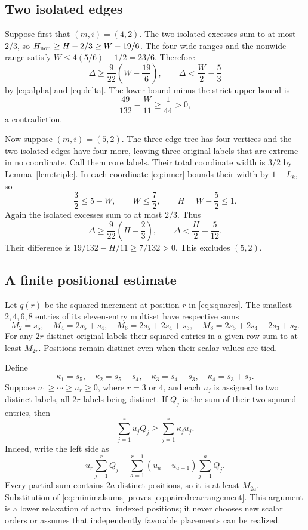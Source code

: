 \documentclass[11pt]{article}
\theoremstyle{definition}
\theoremstyle{remark}
\begin{document}
\subsection{Two isolated edges}

Suppose first that $(m,i)=(4,2)$. The two isolated excesses sum to at most
$2/3$, so $H_{\rm non}\geq H-2/3\geq W-19/6$. The four wide ranges
and the nonwide range satisfy $W\leq4(5/6)+1/2=23/6$. Therefore
\[
 \Delta\geq\frac9{22}\left(W-\frac{19}{6}\right),
 \qquad
 \Delta<\frac W2-\frac53
\]
by \eqref{eq:alpha} and \eqref{eq:delta}. The lower bound minus the
strict upper bound is
\[
 \frac{49}{132}-\frac W{11}\geq\frac1{44}>0,
\]
a contradiction.

Now suppose $(m,i)=(5,2)$. The three-edge tree has four vertices and the
two isolated edges have four more, leaving three original labels that
are extreme in no coordinate. Call them core labels. Their total
coordinate width is $3/2$ by Lemma~\ref{lem:triple}. In each coordinate
\eqref{eq:inner} bounds their width by $1-L_k$, so
\[
 \frac32\leq5-W,\qquad W\leq\frac72,
 \qquad H=W-\frac52\leq1.
\]
Again the isolated excesses sum to at most $2/3$. Thus
\[
 \Delta\geq\frac9{22}\left(H-\frac23\right),
 \qquad
 \Delta<\frac H2-\frac5{12}.
\]
Their difference is $19/132-H/11\geq7/132>0$. This excludes $(5,2)$.

\subsection{A finite positional estimate}\label{subsec:positions}

Let $q(r)$ be the squared increment at position $r$ in
\eqref{eq:squares}. The smallest $2,4,6,8$ entries of its eleven-entry
multiset have respective sums
\begin{equation}\label{eq:minimalsums}
 M_2=s_5,\quad M_4=2s_5+s_4,\quad
 M_6=2s_5+2s_4+s_3,\quad
 M_8=2s_5+2s_4+2s_3+s_2.
\end{equation}
For any $2r$ distinct original labels their squared entries in a given
row sum to at least $M_{2r}$. Positions remain distinct even when their
scalar values are tied.

Define
\begin{equation}\label{eq:kappas}
 \kappa_1=s_5,\quad \kappa_2=s_5+s_4,\quad
 \kappa_3=s_4+s_3,\quad \kappa_4=s_3+s_2.
\end{equation}
Suppose $u_1\geq\cdots\geq u_r\geq0$, where $r=3$ or $4$, and
each $u_j$ is assigned to two distinct labels, all $2r$ labels being
distinct. If $Q_j$ is the sum of their two squared entries, then
\begin{equation}\label{eq:pairedrearrangement}
 \sum_{j=1}^ru_jQ_j\geq\sum_{j=1}^r\kappa_j u_j.
\end{equation}
Indeed, write the left side as
\[
 u_r\sum_{j=1}^rQ_j+
 \sum_{a=1}^{r-1}(u_a-u_{a+1})\sum_{j=1}^aQ_j.
\]
Every partial sum contains $2a$ distinct positions, so it is at least
$M_{2a}$. Substitution of \eqref{eq:minimalsums} proves
\eqref{eq:pairedrearrangement}. This argument is a lower relaxation of
actual indexed positions; it never chooses new scalar orders or assumes
that independently favorable placements can be realized.
\end{document}
